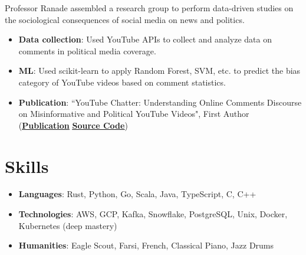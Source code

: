 \documentclass[letterpaper,11pt]{article}
\newcommand{\resumeItem}[2]{
  \item\small{
    \textbf{#1}{: #2 \vspace{-2pt}}
  }
}
\newcommand{\resumeSubItem}[2]{\resumeItem{#1}{#2}\vspace{-4pt}}
\newcommand{\resumeSubHeadingListStart}{\begin{itemize}[leftmargin=*]}
\newcommand{\resumeSubHeadingListEnd}{\end{itemize}}
\begin{document}
    \vspace{4mm}
      Professor Ranade assembled a research group to perform data-driven studies on the sociological consequences of social media on news and politics.
      
  \resumeSubHeadingListStart
    \resumeSubItem{Data collection}
      {Used YouTube APIs to collect and analyze data on comments in political media coverage.}
    \resumeSubItem{ML} {Used scikit-learn to apply Random Forest, SVM, etc. to predict the bias category of YouTube videos based on comment statistics.}
    \resumeSubItem{Publication} {``YouTube Chatter: Understanding Online Comments Discourse on Misinformative and Political YouTube Videos", First Author (\href{https://arxiv.org/abs/1907.00435}{\underline{\textbf{Publication}}} \textbar \hspace{0.5mm} \href{https://github.com/aarashy/YouTubeComments}{\underline{\textbf{Source Code}}})}
    \resumeSubHeadingListEnd

    \vspace{4mm}

\section{Skills}
 \resumeSubHeadingListStart
    \resumeSubItem{Languages}{Rust, Python, Go, Scala, Java, TypeScript, C, C++}
    \resumeSubItem{Technologies}{AWS, GCP, Kafka, Snowflake, PostgreSQL,  Unix, Docker, Kubernetes (deep mastery)}
    \resumeSubItem{Humanities}{Eagle Scout,  Farsi, French, Classical Piano, Jazz Drums}
 \resumeSubHeadingListEnd


\end{document}
